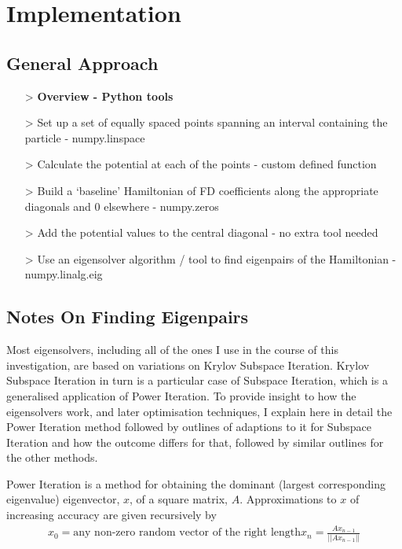 \section{Implementation}
\subsection{General Approach}
\begin{itemize}
    \item[>]{\textbf{Overview - Python tools}\\}
    \item[>]{Set up a set of equally spaced points spanning an interval containing the particle - numpy.linspace}
    \item[>]{Calculate the potential at each of the points - custom defined function}
    \item[>]{Build a `baseline' Hamiltonian of FD coefficients along the appropriate diagonals and $0$ elsewhere - numpy.zeros}
    \item[>]{Add the potential values to the central diagonal - no extra tool needed}
    \item[>]{Use an eigensolver algorithm / tool to find eigenpairs of the Hamiltonian - numpy.linalg.eig}
\end{itemize}

\subsection{Notes On Finding Eigenpairs}
Most eigensolvers, including all of the ones I use in the course of this investigation, are based on variations on Krylov Subspace Iteration. Krylov Subspace Iteration in turn is a particular case of Subspace Iteration, which is a generalised application of Power Iteration. To provide insight to how the eigensolvers work, and later optimisation techniques, I explain here in detail the Power Iteration method followed by outlines of adaptions to it for Subspace Iteration and how the outcome differs for that, followed by similar outlines for the other methods. 

Power Iteration is a method for obtaining the dominant (largest corresponding eigenvalue) eigenvector, $x$, of a square matrix, $A$. Approximations to $x$ of increasing accuracy are given recursively by
\begin{align*}
	x_0 = \text{any non-zero random vector of the right length}
	x_{n} = \frac{Ax_{n-1}}{||Ax_{n-1}||}
\end{align*}

